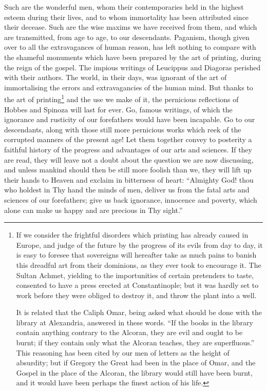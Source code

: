 Such are the wonderful men, whom their contemporaries held in the
highest esteem during their lives, and to whom immortality has been
attributed since their decease. Such are the wise maxims we have
received from them, and which are transmitted, from age to age, to our
descendants. Paganism, though given over to all the extravagances of
human reason, has left nothing to compare with the shameful monuments
which have been prepared by the art of printing, during the reign of
the gospel. The impious writings of Leucippus and Diagoras perished
with their authors. The world, in their days, was ignorant of the art
of immortalising the errors and extravagancies of the human mind. But
thanks to the art of printing\footnote{If we consider the frightful
disorders which printing has already caused in Europe, and judge of
the future by the progress of its evils from day to day, it is easy to
foresee that sovereigns will hereafter take as much pains to banish
this dreadful art from their dominions, as they ever took to encourage
it. The Sultan Achmet, yielding to the importunities of certain
pretenders to taste, consented to have a press erected at
Constantinople; but it was hardly set to work before they were obliged
to destroy it, and throw the plant into a well.

It is related that the Caliph Omar, being asked what should be done
with the library at Alexandria, answered in these words. ``If the
books in the library contain anything contrary to the Alcoran, they
are evil and ought to be burnt; if they contain only what the Alcoran
teaches, they are superfluous.'' This reasoning has been cited by our
men of letters as the height of absurdity; but if Gregory the Great
had been in the place of Omar, and the Gospel in the place of the
Alcoran, the library would still have been burnt, and it would have
been perhaps the finest action of his life.} and the use we make of it,
the pernicious reflections of Hobbes and Spinoza will last for ever.
Go, famous writings, of which the ignorance and rusticity of our
forefathers would have been incapable. Go to our descendants, along
with those still more pernicious works which reek of the corrupted
manners of the present age! Let them together convey to posterity a
faithful history of the progress and  advantages of our arts
and sciences. If they are read, they will leave not a doubt about the
question we are now discussing, and unless mankind should then be
still more foolish than we, they will lift up their hands to Heaven
and exclaim in bitterness of heart: ``Almighty God! thou who holdest
in Thy hand the minds of men, deliver us from the fatal arts and
sciences of our forefathers; give us back ignorance, innocence and
poverty, which alone can make us happy and are precious in Thy
sight.''

